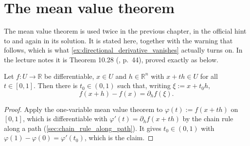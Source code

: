 
\section{The mean value theorem}
\label{sec:mean_value_theorem}

\begin{ainote}
The mean value theorem is used twice in the previous chapter, in the official hint to
 and again in its solution. It is stated here, together
with the warning that follows, which is what \cref{ex:directional_derivative_vanishes} actually
turns on. In the lecture notes it is Theorem 10.28 (,
p.\ 44), proved exactly as below.
\end{ainote}

\begin{theorem}
\label{thm:mean_value_theorem}
Let $f : U \to \mathbb{R}$ be differentiable, $x \in U$ and $h \in \mathbb{R}^n$ with
$x+th \in U$ for all $t \in [0,1]$. Then there is $t_0 \in (0,1)$ such that, writing
$\xi := x+t_0h$,
\[f(x+h)-f(x) = \partial_hf(\xi).\]
\end{theorem}

\begin{proof}
Apply the one-variable mean value theorem to $\varphi(t) := f(x+th)$ on $[0,1]$, which is
differentiable with $\varphi'(t) = \partial_hf(x+th)$ by the chain rule along a path
(\cref{sec:chain_rule_along_path}). It gives $t_0 \in (0,1)$ with
$\varphi(1)-\varphi(0) = \varphi'(t_0)$, which is the claim.
\end{proof}


